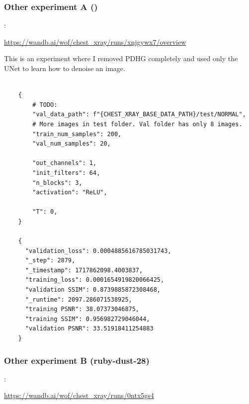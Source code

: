 \documentclass[12pt]{article}
\begin{document}
\subsubsection{Other experiment A ()}:

\url{https://wandb.ai/wof/chest_xray/runs/xnjgywx7/overview}

This is an experiment where I removed PDHG completely and used only the UNet to learn how to denoise an image.

    \begin{verbatim}

    {
        # TODO: 
        "val_data_path": f"{CHEST_XRAY_BASE_DATA_PATH}/test/NORMAL", 
        # More images in test folder. Val folder has only 8 images.
        "train_num_samples": 200,
        "val_num_samples": 20,

        "out_channels": 1,
        "init_filters": 64,
        "n_blocks": 3,
        "activation": "ReLU",
        
        "T": 0,
    }

    {
      "validation_loss": 0.0004885616785031743,
      "_step": 2879,
      "_timestamp": 1717862098.4003837,
      "training_loss": 0.0001654919820066425,
      "validation SSIM": 0.8739885872308468,
      "_runtime": 2097.286071538925,
      "training PSNR": 38.07373046875,
      "training SSIM": 0.956982729046044,
      "validation PSNR": 33.51918411254883
    }
    \end{verbatim}


\subsubsection{Other experiment B (ruby-dust-28)}:

\url{https://wandb.ai/wof/chest_xray/runs/0ntx5gs4}
\end{document}
